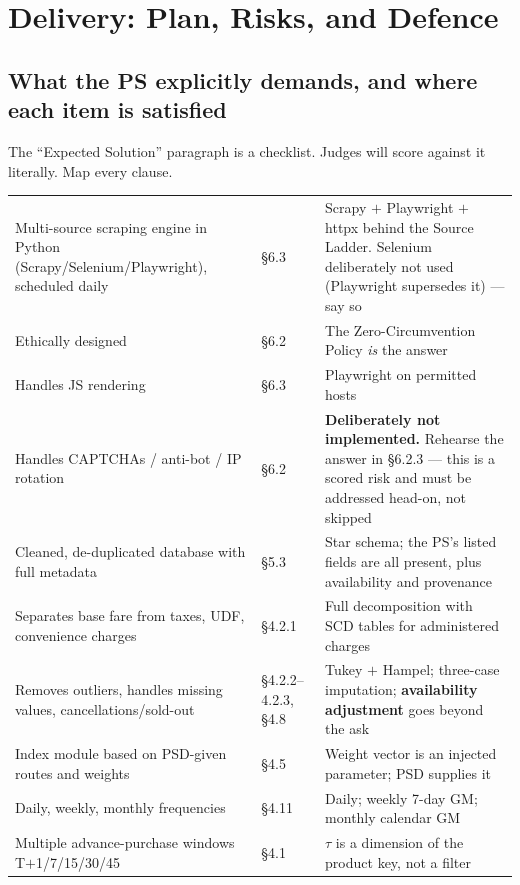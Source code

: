 \chapter{Delivery: Plan, Risks, and Defence}

\section{What the PS explicitly demands, and where each item is satisfied}

The ``Expected Solution'' paragraph is a checklist. Judges will score against it literally.
Map every clause.

\begin{center}
\footnotesize
\begin{tabularx}{\textwidth}{@{}L{6.0cm} L{2.0cm} X@{}}
\toprule
{} &  &  \\
\midrule
Multi-source scraping engine in Python (Scrapy/Selenium/Playwright), scheduled daily & \S6.3 & Scrapy $+$ Playwright $+$ httpx behind the Source Ladder. Selenium deliberately not used (Playwright supersedes it) --- say so \\
Ethically designed & \S6.2 & The Zero-Circumvention Policy \emph{is} the answer \\
Handles JS rendering & \S6.3 & Playwright on permitted hosts \\
Handles CAPTCHAs / anti-bot / IP rotation & \S6.2 & \textbf{Deliberately not implemented.} Rehearse the answer in \S6.2.3 --- this is a scored risk and must be addressed head-on, not skipped \\
Cleaned, de-duplicated database with full metadata & \S5.3 & Star schema; the PS's listed fields are all present, plus availability and provenance \\
Separates base fare from taxes, UDF, convenience charges & \S4.2.1 & Full decomposition with SCD tables for administered charges \\
Removes outliers, handles missing values, cancellations/sold-out & \S4.2.2--4.2.3, \S4.8 & Tukey $+$ Hampel; three-case imputation; \textbf{availability adjustment} goes beyond the ask \\
Index module based on PSD-given routes and weights & \S4.5 & Weight vector is an injected parameter; PSD supplies it \\
Daily, weekly, monthly frequencies & \S4.11 & Daily; weekly 7-day GM; monthly calendar GM \\
Multiple advance-purchase windows T$+$1/7/15/30/45 & \S4.1 & $\tau$ is a dimension of the product key, not a filter \\

\end{tabularx}
\end{center}

